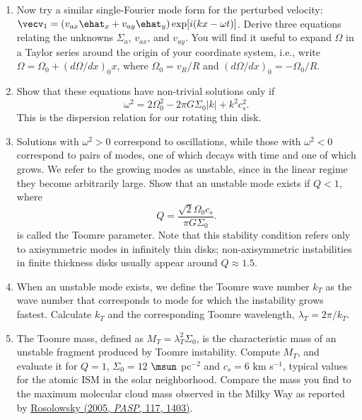 \documentclass[twoside]{tufte-book} %
\begin{document}
\begin{enumerate}
\begin{enumerate}
\item Now try a similar single-Fourier mode form for the perturbed velocity: $\vecv_1 = (v_{ax} \ehat_x + v_{ay} \ehat_y) \exp[i(kx - \omega t)]$. Derive three equations relating the unknowns $\Sigma_a$, $v_{ax}$, and $v_{ay}$. You will find it useful to expand $\Omega$ in a Taylor series around the origin of your coordinate system, i.e., write $\Omega = \Omega_0 + (d\Omega/dx)_0 x$, where $\Omega_0 = v_R/R$ and $(d\Omega/dx)_{0} = -\Omega_0/R$.
\item Show that these equations have non-trivial solutions only if
\begin{displaymath}
\omega^2 = 2 \Omega_0^2 - 2 \pi G \Sigma_0 |k| + k^2 c_s^2.
\end{displaymath}
This is the dispersion relation for our rotating thin disk.
\item Solutions with $\omega^2 > 0$ correspond to oscillations, while those with $\omega^2 < 0$ correspond to pairs of modes, one of which decays with time and one of which grows. We refer to the growing modes as unstable, since in the linear regime they become arbitrarily large. Show that an unstable mode exists if $Q<1$, where
\begin{displaymath}
Q = \frac{\sqrt{2} \Omega_0 c_s}{\pi G \Sigma_0}.
\end{displaymath}
is called the Toomre parameter. Note that this stability condition refers only to axisymmetric modes in infinitely thin disks; non-axisymmetric instabilities in finite thickness disks usually appear around $Q\approx 1.5$.
\item When an unstable mode exists, we define the Toomre wave number $k_T$ as the wave number that corresponds to mode for which the instability grows fastest. Calculate $k_T$ and the corresponding Toomre wavelength, $\lambda_T = 2\pi / k_T$.
\item The Toomre mass, defined as $M_T =  \lambda_T^2 \Sigma_0$, is the characteristic mass of an unstable fragment produced by Toomre instability. Compute $M_T$, and evaluate it for $Q=1$, $\Sigma_0=12$ $\msun$ pc$^{-2}$ and $c_s = 6$ km s$^{-1}$, typical values for the atomic ISM in the solar neighborhood. Compare the mass you find to the maximum molecular cloud mass observed in the Milky Way as reported by \href{http://adsabs.harvard.edu/abs/2005PASP..117.1403R}{Rosolowsky (2005, {\it PASP}, 117, 1403)}. \nocite{rosolowsky05b}\\
\end{enumerate}



\end{enumerate}
\end{document}
